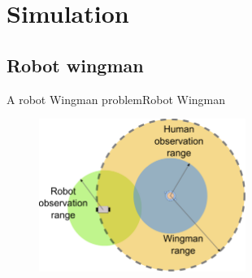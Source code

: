 \section{Simulation}

\subsection{Robot wingman}

\begin{frame}{A robot Wingman problem}{Robot Wingman}

\begin{figure}
\centering
\includegraphics[width = 0.6\textwidth]{./figure/Wingman}
\end{figure}

\end{frame}

